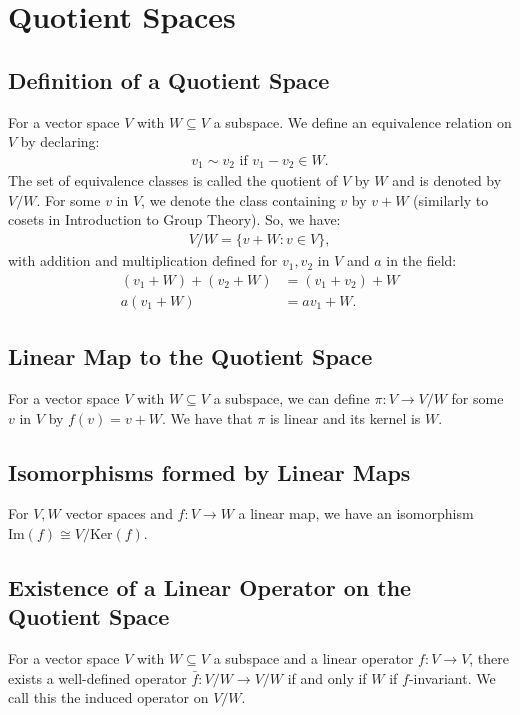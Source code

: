 \documentclass[a4paper, 12pt, twoside]{article}
\begin{document}
\section{Quotient Spaces}

\subsection{Definition of a Quotient Space}

For a vector space $V$ with $W \subseteq V$ a subspace. We define an equivalence
relation on $V$ by declaring: \begin{gather*}
  v_1 \sim v_2 \text{ if } v_1 - v_2 \in W.
\end{gather*} The set of equivalence classes is called the quotient of $V$
by $W$ and is denoted by $V/W$. For some $v$ in $V$, we denote the class containing
$v$ by $v + W$ (similarly to cosets in Introduction to Group Theory). So, we have:
\begin{gather*}
  V/W = \{v + W : v \in V\},
\end{gather*} with addition and multiplication defined for 
$v_1, v_2$ in $V$ and $a$ in the field: \begin{align*}
  (v_1 + W) + (v_2 + W) &= (v_1 + v_2) + W \\
  a(v_1 + W) &= av_1 + W.
\end{align*}

\subsection{Linear Map to the Quotient Space}

For a vector space $V$ with $W \subseteq V$ a subspace, we can
define $\pi : V \to V/W$ for some $v$ in $V$ by $f(v) = v + W$.
We have that $\pi$ is linear and its kernel is $W$.

\subsection{Isomorphisms formed by Linear Maps}

For $V, W$ vector spaces and $f : V \to W$ a linear map, we have
an isomorphism $\text{Im}(f) \cong V/\text{Ker}(f)$.

\subsection{Existence of a Linear Operator on the Quotient Space}

For a vector space $V$ with $W \subseteq V$ a subspace and a linear
operator $f : V \to V$, there exists a well-defined operator
$\bar{f} : V/W \to V/W$ if and only if $W$ if $f$-invariant.
We call this the induced operator on $V/W$.
\end{document}
